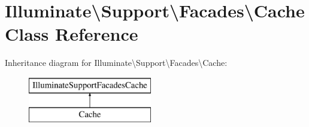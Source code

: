 \hypertarget{class_illuminate_1_1_support_1_1_facades_1_1_cache}{}\section{Illuminate\textbackslash{}Support\textbackslash{}Facades\textbackslash{}Cache Class Reference}
\label{class_illuminate_1_1_support_1_1_facades_1_1_cache}
Inheritance diagram for Illuminate\textbackslash{}Support\textbackslash{}Facades\textbackslash{}Cache\+:\begin{figure}[H]
\begin{center}
\leavevmode
\includegraphics[height=2.000000cm]{class_illuminate_1_1_support_1_1_facades_1_1_cache}
\end{center}
\end{figure}
